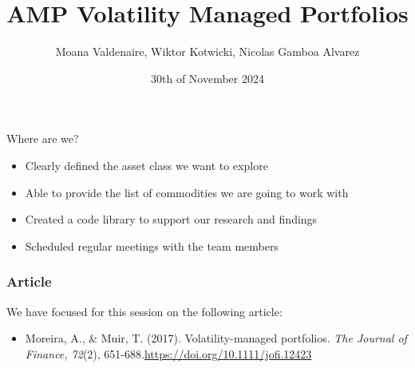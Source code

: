 \documentclass[9pt]{beamer}  %
\title{AMP Volatility Managed Portfolios}  %
\author{Moana Valdenaire, Wiktor Kotwicki, Nicolas Gamboa Alvarez}  %
\date{30th of November 2024}  %
\begin{document}

\begin{frame}
    \titlepage  %
\end{frame}


\begin{frame}{Where are we?}

    \begin{itemize}
        \item Clearly defined the asset class we want to explore
        \item Able to provide the list of commodities we are going to work with 
        \item Created a code library to support our research and findings 
        \item Scheduled regular meetings with the team members
    \end{itemize}


\end{frame}


\begin{frame}
    \frametitle{Article}  %
    We have focused for this session on the following article:
    \begin{itemize}
        \item Moreira, A., \& Muir, T. (2017). Volatility-managed portfolios. \textit{The Journal of Finance, 72}(2), 651-688.\hspace{0.2cm}\href{https://doi.org/10.1111/jofi.12423}{https://doi.org/10.1111/jofi.12423}
    \end{itemize}
\end{frame}

\end{document}
